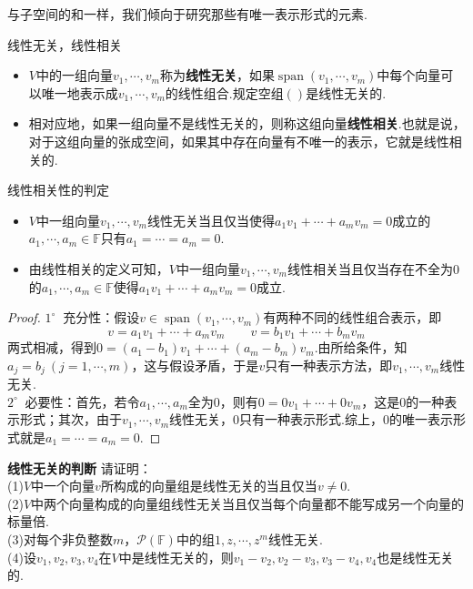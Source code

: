 \documentclass[lang=cn, zihao=5]{elegantbook}
\newcommand{\F}{\mathbb{F}}
\newcommand{\buzhou}[1]{$#1^{\circ} \ $}
\DeclareMathOperator{\spn}{span}
\newcommand{\examplefont}[1]{\color{mgreen} \textbf{#1}}
\begin{document}
与子空间的和一样，我们倾向于研究那些有唯一表示形式的元素.

\begin{definition}{线性无关，线性相关}
	\begin{itemize}
		\item $V$中的一组向量$v_1, \cdots , v_m$称为\textbf{线性无关}，如果$\spn (v_1, \cdots ,v_m)$中每个向量可以唯一地表示成$v_1, \cdots ,v_m$的线性组合.规定空组$()$是线性无关的.
		\item 相对应地，如果一组向量不是线性无关的，则称这组向量\textbf{线性相关}.也就是说，对于这组向量的张成空间，如果其中存在向量有不唯一的表示，它就是线性相关的.
	\end{itemize}
\end{definition}

\begin{proposition}{线性相关性的判定}
	\begin{itemize}
		\item $V$中一组向量$v_1, \cdots ,v_m$线性无关当且仅当使得$a_1v_1 + \cdots + a_mv_m = 0$成立的$a_1 , \cdots ,a_m \in \F$只有$a_1= \cdots =a_m =0$.
		\item 由线性相关的定义可知，$V$中一组向量$v_1, \cdots ,v_m$线性相关当且仅当存在不全为$0$的$a_1 , \cdots ,a_m \in \F$使得$a_1v_1 + \cdots + a_mv_m = 0$成立.
	\end{itemize}
\end{proposition}
\begin{proof}
	\buzhou{1} 充分性：假设$v \in \spn (v_1, \cdots , v_m)$有两种不同的线性组合表示，即
	$$v = a_1v_1 + \cdots + a_mv_m \qquad v = b_1v_1 + \cdots + b_mv_m$$
	两式相减，得到$0=(a_1-b_1)v_1 + \cdots + (a_m-b_m)v_m$.由所给条件，知$a_j=b_j ~(j=1,\cdots ,m)$，这与假设矛盾，于是$v$只有一种表示方法，即$v_1, \cdots ,v_m$线性无关. \\
	\buzhou{2} 必要性：首先，若令$a_1, \cdots , a_m$全为$0$，则有$0=0v_1 + \cdots + 0v_m$，这是$0$的一种表示形式；其次，由于$v_1, \cdots ,v_m$线性无关，$0$只有一种表示形式.综上，$0$的唯一表示形式就是$a_1= \cdots = a_m =0$.
\end{proof}

\begin{example}{\examplefont{线性无关的判断}}
	请证明： \\
	(1)$V$中一个向量$v$所构成的向量组是线性无关的当且仅当$v \neq 0$. \\
	(2)$V$中两个向量构成的向量组线性无关当且仅当每个向量都不能写成另一个向量的标量倍. \\
	(3)对每个非负整数$m$，$\mathcal{P} (\F)$中的组$1,z, \cdots ,z^m$线性无关. \\
	(4)设$v_1,v_2,v_3,v_4$在$V$中是线性无关的，则$v_1-v_2,v_2-v_3,v_3-v_4,v_4$也是线性无关的.
\end{example}
\end{document}
